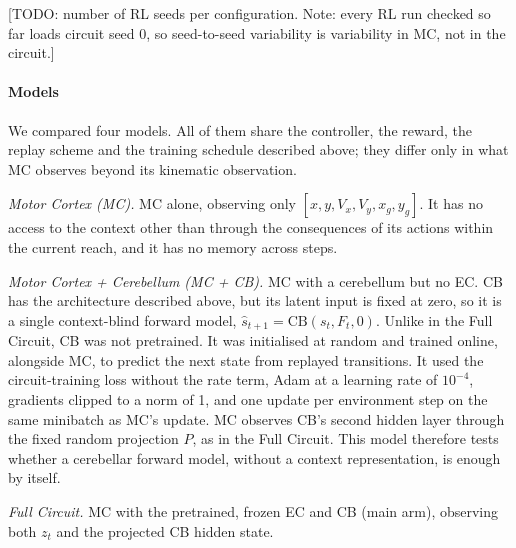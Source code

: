 [TODO: number of RL seeds per configuration. Note: every RL run checked so far loads circuit seed 0, so seed-to-seed variability is variability in MC, not in the circuit.]

\paragraph{Models}
We compared four models. All of them share the controller, the reward, the replay scheme and the training schedule described above; they differ only in what MC observes beyond its kinematic observation.

\textit{Motor Cortex (MC).} MC alone, observing only $[x, y, V_x, V_y, x_g, y_g]$. It has no access to the context other than through the consequences of its actions within the current reach, and it has no memory across steps.

\textit{Motor Cortex + Cerebellum (MC + CB).} MC with a cerebellum but no EC. CB has the architecture described above, but its latent input is fixed at zero, so it is a single context-blind forward model, $\hat{s}_{t+1} = \mathrm{CB}(s_t, F_t, 0)$. Unlike in the Full Circuit, CB was not pretrained. It was initialised at random and trained online, alongside MC, to predict the next state from replayed transitions. It used the circuit-training loss without the rate term, Adam at a learning rate of $10^{-4}$, gradients clipped to a norm of 1, and one update per environment step on the same minibatch as MC's update. MC observes CB's second hidden layer through the fixed random projection $P$, as in the Full Circuit. This model therefore tests whether a cerebellar forward model, without a context representation, is enough by itself.

\textit{Full Circuit.} MC with the pretrained, frozen EC and CB (main arm), observing both $z_t$ and the projected CB hidden state.

